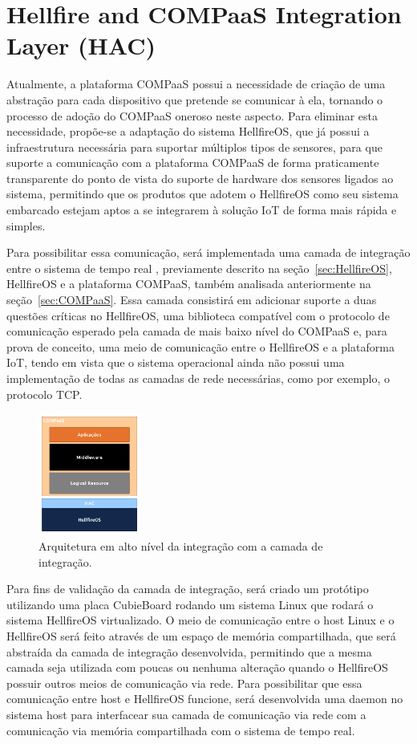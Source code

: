 \section{Hellfire and COMPaaS Integration Layer (HAC)}
\label{sec:HAC}
Atualmente, a plataforma COMPaaS possui a necessidade de criação de uma abstração para
cada dispositivo que pretende se comunicar à ela, tornando o processo de adoção do COMPaaS
oneroso neste aspecto. Para eliminar esta necessidade, propõe-se a adaptação do sistema
HellfireOS, que já possui a infraestrutura necessária para suportar múltiplos tipos de
sensores, para que suporte a comunicação com a plataforma COMPaaS de forma praticamente
transparente do ponto de vista do suporte de hardware dos sensores ligados ao sistema,
permitindo que os produtos que adotem o HellfireOS como seu sistema embarcado estejam aptos
a se integrarem à solução IoT de forma mais rápida e simples.

Para possibilitar essa comunicação, será implementada uma camada de integração entre o sistema de tempo real
, previamente descrito na seção~\ref{sec:HellfireOS}, HellfireOS e a plataforma COMPaaS, também analisada
anteriormente na seção~\ref{sec:COMPaaS}. Essa camada consistirá em adicionar suporte a duas questões
críticas no HellfireOS, uma biblioteca compatível com o protocolo de comunicação esperado pela camada de
mais baixo nível do COMPaaS e, para prova de conceito, uma meio de comunicação entre o HellfireOS e a
plataforma IoT, tendo em vista que o sistema operacional ainda não possui uma implementação de todas as
camadas de rede necessárias, como por exemplo, o protocolo TCP.

\begin{figure}[H]
	\centering
		\includegraphics[width=0.3\textwidth]{fig/COMPaaS_HF.png}
	\caption{Arquitetura em alto nível da integração com a camada de integração.}
\end{figure}

Para fins de validação da camada de integração, será criado um protótipo utilizando uma placa
CubieBoard rodando um sistema Linux que rodará o sistema HellfireOS virtualizado. O meio de comunicação
entre o host Linux e o HellfireOS será feito através de um espaço de memória compartilhada, que será
abstraída da camada de integração desenvolvida, permitindo que a mesma camada seja utilizada com
poucas ou nenhuma alteração quando o HellfireOS possuir outros meios de comunicação via rede.
Para possibilitar que essa comunicação entre host e HellfireOS funcione, será desenvolvida uma
daemon no sistema host para interfacear sua camada de comunicação via rede com a comunicação
via memória compartilhada com o sistema de tempo real.

